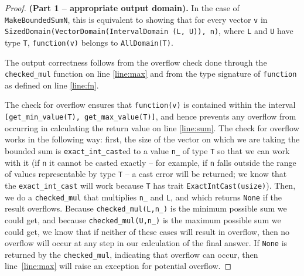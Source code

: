 \documentclass[11pt,a4paper]{article}
\theoremstyle{definition}
\newcommand{\connor}[1]{{ {\color{teal}{(connor)~#1}}}}
\begin{document}
\begin{proof}
    \textbf{(Part 1 -- appropriate output domain).} In the case of \texttt{MakeBoundedSumN}, this is equivalent to showing that for every vector \texttt{v} in \texttt{SizedDomain(VectorDomain(IntervalDomain (L, U)), n)}, where \texttt{L} and \texttt{U} have type \texttt{T}, \texttt{function(v)} belongs to \texttt{AllDomain(T)}.
    
    The output correctness follows from the overflow check done through the \texttt{checked\_mul} function on line \ref{line:max} and from the type signature of \texttt{function} as defined on line \ref{line:fn}.
    
    
    
    The check for overflow ensures that \texttt{function(v)} is contained within the interval \texttt{[get\_min\_value(T), get\_max\_value(T)]}, and hence prevents any overflow from occurring in calculating the return value on line \ref{line:sum}. The check for overflow works in the following way: first, the size of the vector on which we are taking the bounded sum is \texttt{exact\_int\_cast}ed to a value \texttt{n\_} of type \texttt{T} so that we can work with it (if \texttt{n} it cannot be casted exactly -- for example, if \texttt{n} falls outside the range of values representable by type \texttt{T} -- a cast error will be returned; we know that the \texttt{exact\_int\_cast} will work because \texttt{T} has trait \texttt{ExactIntCast(usize)}). Then, we do a \texttt{checked\_mul} that multiplies \texttt{n\_} and \texttt{L}, and which returns \texttt{None} if the result overflows. Because \texttt{checked\_mul(L,n\_)} is the minimum possible sum we could get, and because \texttt{checked\_mul(U,n\_)} is the maximum possible sum we could get, we know that if neither of these cases will result in overflow, then no overflow will occur at any step in our calculation of the final answer. If \texttt{None} is returned by the \texttt{checked\_mul}, indicating that overflow can occur, then line~\ref{line:max} will raise an exception for potential overflow.
    

\end{proof}
\end{document}
